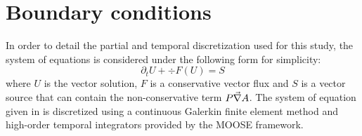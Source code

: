 \section{Boundary conditions} \label{sec:bc}
In order to detail the partial and temporal discretization used for this study, the system of equations  is considered under the following form for simplicity:
\begin{equation}
\label{eq:form}
\partial_t U + \div F\left( U \right) = S
\end{equation}
where $U$ is the vector solution, $F$ is a conservative vector flux and $S$ is a vector source that can contain the non-conservative term $P\vec{\nabla} A$.
The system of equation given in  is discretized using a continuous Galerkin finite element method and high-order temporal integrators provided by the MOOSE framework.
